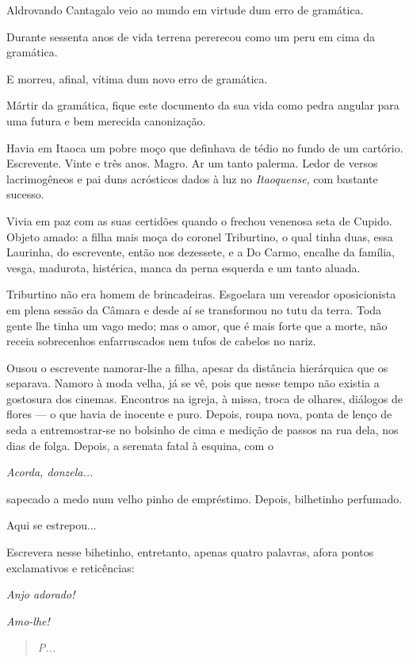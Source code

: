 Aldrovando Cantagalo veio ao mundo em virtude dum erro de gramática.

Durante sessenta anos de vida terrena pererecou como um peru em cima da
gramática.

E morreu, afinal, vítima dum novo erro de gramática.

Mártir da gramática, fique este documento da sua vida como pedra angular
para uma futura e bem merecida canonização.

Havia em Itaoca um pobre moço que definhava de tédio no fundo de um
cartório. Escrevente. Vinte e três anos. Magro. Ar um tanto palerma.
Ledor de versos lacrimogêneos e pai duns acrósticos dados à luz no
\emph{Itaoquense}, com bastante sucesso.

Vivia em paz com as suas certidões quando o frechou venenosa seta de
Cupido. Objeto amado: a filha mais moça do coronel Triburtino, o qual
tinha duas, essa Laurinha, do escrevente, então nos dezessete, e a Do
Carmo, encalhe da família, vesga, madurota, histérica, manca da perna
esquerda e um tanto aluada.

Triburtino não era homem de brincadeiras. Esgoelara um vereador
oposicionista em plena sessão da Câmara e desde aí se transformou no
tutu da terra. Toda gente lhe tinha um vago medo; mas o amor, que é mais
forte que a morte, não receia sobrecenhos enfarruscados nem tufos de
cabelos no nariz.

Ousou o escrevente namorar-lhe a filha, apesar da distância hierárquica
que os separava. Namoro à moda velha, já se vê, pois que nesse tempo não
existia a gostosura dos cinemas. Encontros na igreja, à missa, troca de
olhares, diálogos de flores --- o que havia de inocente e puro. Depois,
roupa nova, ponta de lenço de seda a entremostrar-se no bolsinho de cima
e medição de passos na rua dela, nos dias de folga. Depois, a serenata
fatal à esquina, com o

\emph{Acorda, donzela... }

sapecado a medo num velho pinho de empréstimo. Depois, bilhetinho
perfumado.

Aqui se estrepou...

Escrevera nesse bihetinho, entretanto, apenas quatro palavras, afora
pontos exclamativos e reticências:

\emph{Anjo adorado!}

\emph{Amo-lhe!}

\begin{quote}
\emph{P...}
\end{quote}

